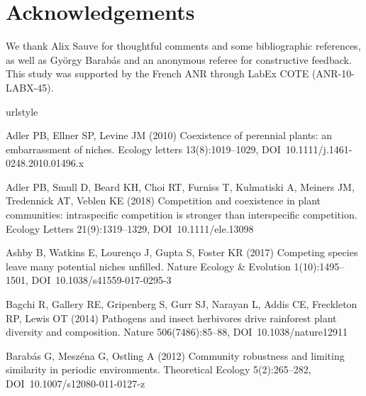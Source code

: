 \documentclass[a4paper,12pt]{article}
\begin{document}
\section*{Acknowledgements} 
We thank Alix Sauve for thoughtful comments and some bibliographic
references, as well as Gy\"orgy Barab\'as and an anonymous referee for
constructive feedback. This study was supported by the French ANR
through LabEx COTE (ANR-10-LABX-45).
% 
\begin{thebibliography}{56}
\providecommand{\natexlab}[1]{#1}
\providecommand{\url}[1]{{#1}}
\providecommand{\urlprefix}{URL }
\expandafter\ifx\csname urlstyle\endcsname\relax
  \providecommand{\doi}[1]{DOI~\discretionary{}{}{}#1}\else
  \providecommand{\doi}{DOI~\discretionary{}{}{}\begingroup
  \urlstyle{rm}\Url}\fi
\providecommand{\eprint}[2][]{\url{#2}}

Adler PB, Ellner SP, Levine JM (2010) Coexistence of perennial plants: an
  embarrassment of niches. Ecology letters 13(8):1019--1029,
  \doi{10.1111/j.1461-0248.2010.01496.x}

Adler PB, Smull D, Beard KH, Choi RT, Furniss T, Kulmatiski A, Meiners JM,
  Tredennick AT, Veblen KE (2018) Competition and coexistence in plant
  communities: intraspecific competition is stronger than interspecific
  competition. Ecology Letters 21(9):1319--1329, \doi{10.1111/ele.13098}

Ashby B, Watkins E, Louren\c{c}o J, Gupta S, Foster KR (2017) Competing species
  leave many potential niches unfilled. Nature Ecology \& Evolution
  1(10):1495--1501, \doi{10.1038/s41559-017-0295-3}

Bagchi R, Gallery RE, Gripenberg S, Gurr SJ, Narayan L, Addis CE, Freckleton
  RP, Lewis OT (2014) Pathogens and insect herbivores drive rainforest plant
  diversity and composition. Nature 506(7486):85--88, \doi{10.1038/nature12911}

Barab\'as G, Mesz\'ena G, Ostling A (2012) Community robustness and limiting
  similarity in periodic environments. Theoretical Ecology 5(2):265--282,
  \doi{10.1007/s12080-011-0127-z}


\end{thebibliography}
\end{document}
